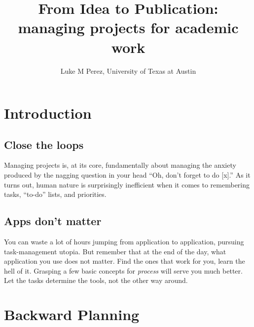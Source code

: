 \documentclass{tufte-handout}
\title{From Idea to Publication: managing projects for academic work}
\author[lmp]{Luke M Perez, University of Texas at Austin}
\begin{document}
\maketitle%



\section{Introduction} %
\label{sec:intro}

\subsection{Close the loops} %
\label{sub:close_the_loops}
Managing projects is, at its core, fundamentally about managing the
anxiety produced by the nagging question in your head ``Oh, don't
forget to do [x].'' As it turns out, human nature is surprisingly
inefficient when it comes to remembering tasks, ``to-do'' lists, and
priorities.

\subsection{Apps don't matter} %
\label{sub:apps_don_t_matter}

You can waste a lot of hours jumping from application to application,
pursuing task-management utopia. But remember that at the end of the
day, what application you use does not matter. Find the ones that work
for you, learn the hell of it. Grasping a few basic concepts for \textit{process}
will serve you much better. Let the tasks determine the tools, not the
other way around.

\section{Backward Planning} %
\label{sec:backward_planning}
\end{document}
